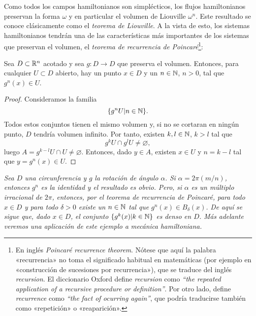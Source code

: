   Como todos los campos hamiltonianos son simplécticos, los flujos hamiltonianos preservan la forma $\omega$ y en particular el volumen de Liouville $\omega^n$. Este resultado se conoce clásicamente como el \emph{teorema de Liouville}. A la vista de esto, los sistemas hamiltonianos tendrán una de las características más importantes de los sistemas que preservan el volumen, el \emph{teorema de recurrencia de Poincaré}\footnote{En inglés \textit{Poincaré recurrence theorem}. Nótese que aquí la palabra «recurrencia» no toma el significado habitual en matemáticas (por ejemplo en «construcción de sucesiones por recurrencia»), que se traduce del inglés \textit{recursion}. El diccionario Oxford define \textit{recursion} como \textit{``the repeated application of a recursive procedure or definition''}. Por otro lado, define \textit{recurrence} como \textit{``the fact of ocurring again''}, que podría traducirse también como «repetición» o «reaparición».}:
\begin{prop}
 Sea $D\subset \mathbb{R}^n$ acotado y sea $g:D\rightarrow D$ que preserva el volumen. Entonces, para cualquier $U\subset D$ abierto, hay un punto $x\in D$ y un $n\in \mathbb{N}$, $n>0$, tal que $g^n(x) \in U$.
\end{prop}
\begin{proof}
  Consideramos la familia
  \begin{equation*}
    \{g^nU | n \in \mathbb{N} \}.
  \end{equation*}
  Todos estos conjuntos tienen el mismo volumen y, si no se cortaran en ningún punto, $D$ tendría volumen infinito. Por tanto, existen $k,l\in \mathbb{N}$, $k>l$ tal que
  \begin{equation*}
    g^kU\cap g^lU \neq \varnothing,
  \end{equation*}
  luego $A=g^{k-l}U \cap U \neq \varnothing$. Entonces, dado $y\in A$, existen $x \in U$ y $n=k-l$ tal que $y=g^n(x)\in U$.
\end{proof}
\begin{ejemplo}
  \em
  Sea $D$ una circunferencia y $g$ la rotación de ángulo $\alpha$. Si $\alpha=2\pi(m/n)$, entonces $g^n$ es la identidad y el resultado es obvio. Pero, si $\alpha$ es un múltiplo irracional de $2\pi$, entonces, por el teorema de recurrencia de Poincaré, para todo $x\in D$ y para todo $\delta>0$ existe un $n\in \mathbb{N}$ tal que $g^n(x) \in B_{\delta}(x)$.
  De aquí se sigue que, dado $x \in D$, el conjunto $\{g^k(x)|k\in \mathbb{N}\}$ es denso en $D$. Más adelante veremos una aplicación de este ejemplo a mecánica hamiltoniana.
\end{ejemplo}

